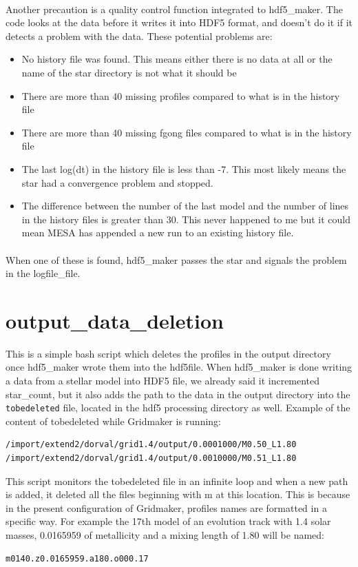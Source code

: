 \documentclass{report}
\begin{document}
\paragraph{} Another precaution is a quality control function integrated to hdf5\_maker. The code looks at the data before it writes it into HDF5 format, and doesn't do it if it detects a problem with the data. These potential problems are:
\begin{itemize}
\item No history file was found. This means either there is no data at all or the name of the star directory is not what it should be
\item There are more than 40 missing profiles compared to what is in the history file
\item There are more than 40 missing fgong files compared to what is in the history file
\item The last log(dt) in the history file is less than -7. This most likely means the star had a convergence problem and stopped.
\item The difference between the number of the last model and the number of lines in the history files is greater than 30. This never happened to me but it could mean MESA has appended a new run to an existing history file.
\end{itemize}
\paragraph{} When one of these is found, hdf5\_maker passes the star and signals the problem in the logfile\_file.

\section{output\_data\_deletion}

This is a simple bash script which deletes the profiles in the output directory once hdf5\_maker wrote them into the hdf5file. When hdf5\_maker is done writing a data from a stellar model into HDF5 file, we already said it incremented star\_count, but it also adds the path to the data in the output directory into the \verb+tobedeleted+ file, located in the hdf5 processing directory as well. Example of the content of tobedeleted while Gridmaker is running:
\begin{verbatim}
/import/extend2/dorval/grid1.4/output/0.0001000/M0.50_L1.80
/import/extend2/dorval/grid1.4/output/0.0010000/M0.51_L1.80
\end{verbatim}
This script monitors the tobedeleted file in an infinite loop and when a new path is added, it deleted all the files beginning with m at this location. This is because in the present configuration of Gridmaker, profiles names are formatted in a specific way. For example the 17th model of an evolution track with 1.4 solar masses, 0.0165959 of metallicity and a mixing length of 1.80 will be named:
\begin{verbatim}
m0140.z0.0165959.a180.o000.17
\end{verbatim}
\end{document}
